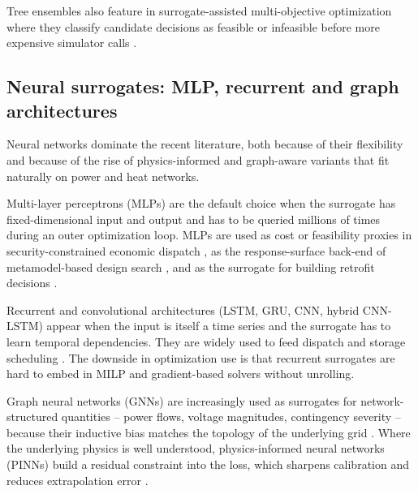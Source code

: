 Tree ensembles also feature in surrogate-assisted multi-objective
optimization where they classify candidate decisions as feasible or
infeasible before more expensive simulator calls
\cite{Han2018622,Schulte2020,Pang2023,Xiao2018}.


\subsection{Neural surrogates: MLP, recurrent and graph
architectures}
\label{sec:tax:nn}

Neural networks dominate the recent literature, both because of their
flexibility and because of the rise of physics-informed and
graph-aware variants that fit naturally on power and heat networks.

Multi-layer perceptrons (MLPs) are the default choice when the
surrogate has fixed-dimensional input and output and has to be
queried millions of times during an outer optimization loop. MLPs are
used as cost or feasibility proxies in security-constrained
economic dispatch
\cite{Chen2022,Chen20244723,Wu2022231,Xu20223066,Guo20222057,Li202359995},
as the response-surface back-end of metamodel-based design search
\cite{Roth2019214,Hirvonen2017323,Jia2022553,Li2023,Wang2020202933},
and as the surrogate for building retrofit decisions
\cite{Thrampoulidis2021,Reynolds2017704,Koschwitz2018134}.

Recurrent and convolutional architectures (LSTM, GRU, CNN, hybrid
CNN-LSTM) appear when the input is itself a time series and the
surrogate has to learn temporal dependencies. They are widely used
to feed dispatch and storage scheduling
\cite{Rafi202132436,Sideratos2020,Li2019,Tian2020,Yang2020415,Wang2023,Shi2024,Lu20232989,Hanifi2024}.
The downside in optimization use is that recurrent surrogates are
hard to embed in MILP and gradient-based solvers without unrolling.

Graph neural networks (GNNs) are increasingly used as surrogates for
network-structured quantities -- power flows, voltage magnitudes,
contingency severity -- because their inductive bias matches the
topology of the underlying grid
\cite{Park2019,Su2022315,Liu20223726,Chen2023657}. Where the
underlying physics is well understood, physics-informed neural
networks (PINNs) build a residual constraint into the loss, which
sharpens calibration and reduces extrapolation error
\cite{Park2019,Su2022315,Liu20222679,Chen2023657}.


